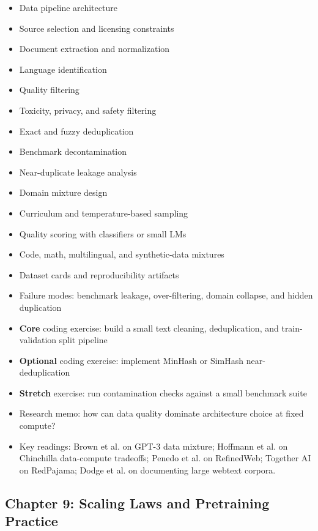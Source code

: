 \documentclass[11pt]{article}
\begin{document}
\begin{itemize}
    \item Data pipeline architecture
    \item Source selection and licensing constraints
    \item Document extraction and normalization
    \item Language identification
    \item Quality filtering
    \item Toxicity, privacy, and safety filtering
    \item Exact and fuzzy deduplication
    \item Benchmark decontamination
    \item Near-duplicate leakage analysis
    \item Domain mixture design
    \item Curriculum and temperature-based sampling
    \item Quality scoring with classifiers or small LMs
    \item Code, math, multilingual, and synthetic-data mixtures
    \item Dataset cards and reproducibility artifacts
    \item Failure modes: benchmark leakage, over-filtering, domain collapse, and hidden duplication
    \item \textbf{Core} coding exercise: build a small text cleaning, deduplication, and train-validation split pipeline
    \item \textbf{Optional} coding exercise: implement MinHash or SimHash near-deduplication
    \item \textbf{Stretch} exercise: run contamination checks against a small benchmark suite
    \item Research memo: how can data quality dominate architecture choice at fixed compute?
    \item Key readings: Brown et al. on GPT-3 data mixture; Hoffmann et al. on Chinchilla data-compute tradeoffs; Penedo et al. on RefinedWeb; Together AI on RedPajama; Dodge et al. on documenting large webtext corpora.
\end{itemize}

\subsection{Chapter 9: Scaling Laws and Pretraining Practice}
\end{document}
